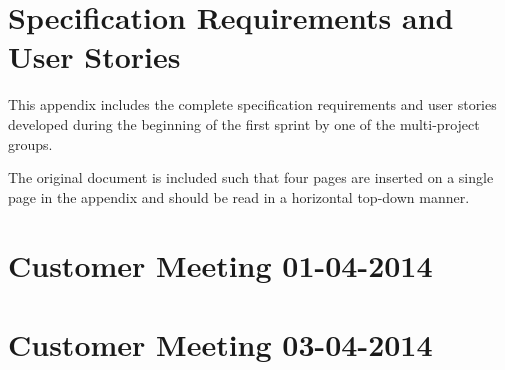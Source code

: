 \chapter{Specification Requirements and User Stories}\label{appendix:requirements}
This appendix includes the complete specification requirements and user stories developed during the beginning of the first sprint by one of the multi-project groups.

The original document is included such that four pages are inserted on a single page in the appendix and should be read in a horizontal top-down manner.



\chapter{Customer Meeting 01-04-2014}\label{appendix:firstmeeting}




\chapter{Customer Meeting 03-04-2014}\label{appendix:secondmeeting}

